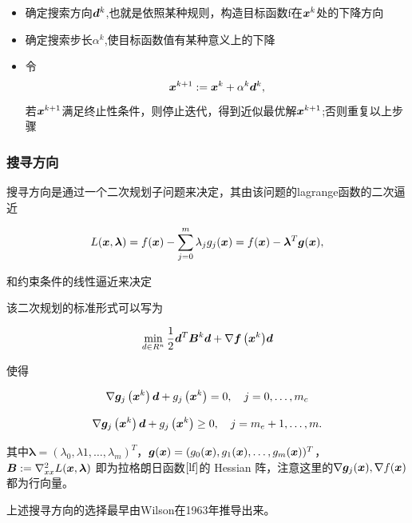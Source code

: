 \documentclass[12pt,oneside,a4paper]{article}
\begin{document}
\begin{itemize}
\item 确定搜索方向${\boldsymbol d}^k$,也就是依照某种规则，构造目标函数f在${\boldsymbol x}^k$处的下降方向
\item 确定搜索步长$\alpha^k$,使目标函数值有某种意义上的下降
\item 令
\begin{equation}\label{step}
{\boldsymbol x}^{k+1}:={\boldsymbol x}^k+\alpha^k {\boldsymbol d}^k,
\end{equation}
若${\boldsymbol x}^{k+1}$满足终止性条件，则停止迭代，得到近似最优解${\boldsymbol x}^{k+1}$;否则重复以上步骤
\end{itemize}

\subsubsection{搜寻方向}
搜寻方向是通过一个二次规划子问题来决定，其由该问题的lagrange函数的二次逼近

\begin{equation}\label{lf}
L({\boldsymbol x}, {\boldsymbol \lambda})=f({\boldsymbol x})-\sum_{j=0}^{m} \lambda_{j} g_{j}({\boldsymbol x})=
f({\boldsymbol x}) - {\boldsymbol \lambda}^T {\boldsymbol g}({\boldsymbol x}),
\end{equation}

\noindent 和约束条件的线性逼近来决定

该二次规划的标准形式可以写为

\begin{equation}\label{qp}
\min _{d \in R^{n}} \frac{1}{2} {\boldsymbol d}^{T} {\boldsymbol B}^{k} {\boldsymbol d}+\nabla {\boldsymbol f\left({\boldsymbol x}^{k}\right)} {\boldsymbol d}
\end{equation}

\noindent 使得

\begin{equation*}
\nabla {\boldsymbol g}_{j}\left({\boldsymbol x}^{k}\right) {\boldsymbol d}+g_{j}\left({\boldsymbol x}^{k}\right)=0, \quad j=0, \ldots, m_{c}
\end{equation*}

\begin{equation*}
\nabla {\boldsymbol g}_{j}\left({\boldsymbol x}^{k}\right) {\boldsymbol d}+g_{j}\left({\boldsymbol x}^{k}\right) \geq 0, \quad j=m_{e}+1, \ldots, m.
\end{equation*}

其中${\boldsymbol \lambda}=(\lambda_0,\lambda1,\ldots,\lambda_m)^T$，${\boldsymbol g}({\boldsymbol x})=
(g_0({\boldsymbol x}),g_1({\boldsymbol x}),\ldots,g_m({\boldsymbol x}))^T$，${\boldsymbol B}:=\nabla_{x x}^{2} L({\boldsymbol x}, {\boldsymbol \lambda})$
即为拉格朗日函数$\ref{lf}$的 Hessian 阵，注意这里的$\nabla {\boldsymbol g}_{j}({\boldsymbol x}),\nabla f({\boldsymbol x})$都为行向量。

上述搜寻方向的选择最早由Wilson\cite{wilson}在1963年推导出来。
\end{document}
